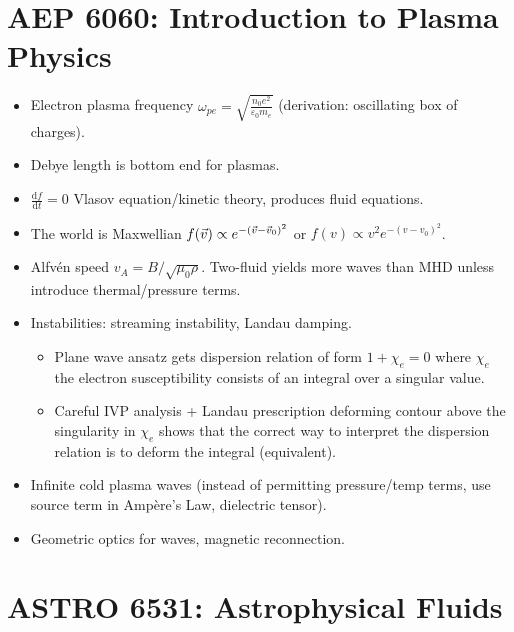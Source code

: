 \documentclass[11pt,
        usenames, %
        dvipsnames %
    ]{article}
\newcommand*{\rd}[2]{\frac{\mathrm{d}#1}{\mathrm{d}#2}}
\DeclarePairedDelimiter\p{\lparen}{\rparen}
\begin{document}
\section{AEP 6060: Introduction to Plasma Physics}

\begin{itemize}
    \item Electron plasma frequency $\omega_{pe} =
        \sqrt{\frac{n_0e^2}{\varepsilon_0m_e}}$ (derivation: oscillating box of
        charges).
    \item Debye length is bottom end for plasmas.
    \item $\rd{f}{t} = 0$ Vlasov equation/kinetic theory, produces fluid
        equations.
    \item The world is Maxwellian $f(\vec{v}) \propto e^{-\p*{\vec{v} -
        \vec{v}_0}^2}$ or $f(v) \propto v^2e^{-(v - v_0)^2}$.
    \item Alfv\'en speed $v_A = B/\sqrt{\mu_0\rho}$. Two-fluid yields more waves
        than MHD unless introduce thermal/pressure terms.

    \item Instabilities: streaming instability, Landau damping.
    \begin{itemize}
        \item Plane wave ansatz gets dispersion relation of form $1 + \chi_e =
            0$ where $\chi_e$ the electron susceptibility consists of an
            integral over a singular value.

        \item Careful IVP analysis + Landau prescription deforming contour above
            the singularity in $\chi_e$ shows that the correct way to interpret
            the dispersion relation is to deform the integral (equivalent).
    \end{itemize}

    \item Infinite cold plasma waves (instead of permitting pressure/temp terms,
        use source term in Amp\`ere's Law, dielectric tensor).

    \item Geometric optics for waves, magnetic reconnection.
\end{itemize}

\section{ASTRO 6531: Astrophysical Fluids}
\end{document}
